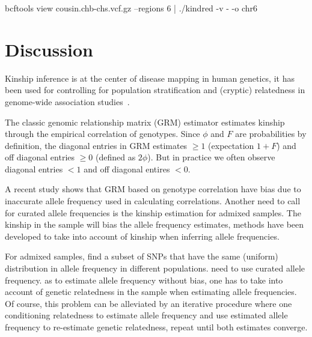 \documentclass[11pt,Times]{article}
\def\cite{\citep}
\begin{document}
bcftools view cousin.chb-chs.vcf.gz --regions 6 | ./kindred -v - -o chr6  

\newpage
\section{Discussion}
Kinship inference is at the center of disease mapping in human genetics, it has been used for controlling for population stratification and (cryptic) relatedness in genome-wide association studies~\cite{eigenstrat, thornton.mcpeek.10,emmax, zhou.stephens.12, chen.etal.16}. 

The classic genomic relationship matrix (GRM) estimator  estimates kinship through the empirical correlation of genotypes. 
Since $\phi$ and $F$ are probabilities by definition, the diagonal entries in GRM estimates $\ge 1$ (expectation $1+F$) and off diagonal entries $\ge 0$ (defined as $2\phi$). 
But in practice we often observe diagonal entries $<1$ and off diagonal entires $<0$. 

A recent study shows that GRM based on genotype correlation have bias due to inaccurate allele frequency used in calculating correlations. 
Another need to call for curated allele frequencies is the kinship estimation for admixed samples. 
The kinship in the sample will bias the allele frequency estimates, methods have been developed to take into account of kinship when inferring allele frequencies. 





For admixed samples,  find a subset of SNPs that have the same (uniform) distribution in allele frequency in different populations. 
need to use curated allele frequency. as to estimate allele frequency without bias, one has to take into account of genetic relatedness in the sample when estimating allele frequencies. Of course, this problem can be alleviated by an iterative procedure where one conditioning relatedness to estimate allele frequency and use estimated allele frequency to re-estimate genetic relatedness, repeat until both estimates converge. 

\end{document}
